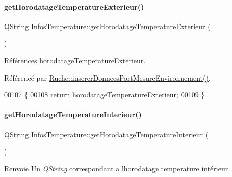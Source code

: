 \mbox{\label{class_infos_temperature_a76b07dc0790718e134e306fe760e6cbf}} 
\paragraph{\texorpdfstring{get\+Horodatage\+Temperature\+Exterieur()}{getHorodatageTemperatureExterieur()}}
{\footnotesize\ttfamily Q\+String Infos\+Temperature\+::get\+Horodatage\+Temperature\+Exterieur (\begin{DoxyParamCaption}{ }\end{DoxyParamCaption})}



Références \hyperlink{class_infos_temperature_a5c3cd364746dc1cae5f9faee55c7555e}{horodatage\+Temperature\+Exterieur}.



Référencé par \hyperlink{class_ruche_a46c0f440f40a5125f2d579b481660457}{Ruche\+::inserer\+Donnees\+Port\+Mesure\+Environnement()}.


\begin{DoxyCode}
00107 \{
00108     \textcolor{keywordflow}{return} \hyperlink{class_infos_temperature_a5c3cd364746dc1cae5f9faee55c7555e}{horodatageTemperatureExterieur};
00109 \}
\end{DoxyCode}
\mbox{\label{class_infos_temperature_aca40f109786cf22d78402f8b7f3fe408}} 
\paragraph{\texorpdfstring{get\+Horodatage\+Temperature\+Interieur()}{getHorodatageTemperatureInterieur()}}
{\footnotesize\ttfamily Q\+String Infos\+Temperature\+::get\+Horodatage\+Temperature\+Interieur (\begin{DoxyParamCaption}{ }\end{DoxyParamCaption})}

\begin{DoxyReturn}{Renvoie}
Un {\itshape Q\+String} correspondant a l\textquotesingle{}horodatage temperature intérieur 
\end{DoxyReturn}



